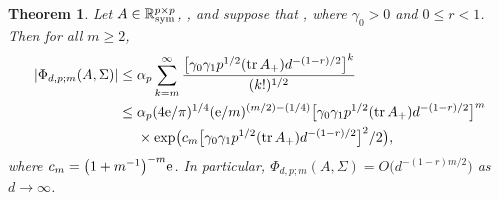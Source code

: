 \documentclass[pdftex]{sigma}
\numberwithin{equation}{section}
\newtheorem{Theorem}{Theorem}[section]
\def\R {\mathbb{R}}
\def\tr {\mathop{\mathrm{tr}}}
\newcommand{\sym}{{{\hskip-1pt}\mathop{\mathrm{sym}}}}
\begin{document}
\begin{Theorem}
\label{thm_Phi_m_bound_Bingham}
Let $A \in \R^{p \times p}_\sym$, \smash{$\Sigma \in \R^{d \times d}_\sym$}, and suppose that , where $\gamma_0 > 0$ and $0 \le r < 1$. Then for all $m \ge 2$,
\begin{align}
|\Phi_{d,p;m}(A,\Sigma)| \le{}& \alpha_p \sum_{k=m}^\infty \frac{\bigl[\gamma_0 \gamma_1 p^{1/2} (\tr A_+) d^{-(1-r)/2}\bigr]^k}{(k!)^{1/2}} \label{eq_Phi_m_bound} \\
\le{}& \alpha_p (4 {\rm e}/\pi)^{1/4} ({\rm e}/m)^{(m/2)-(1/4)}
\bigl[\gamma_0 \gamma_1 p^{1/2} (\tr A_+) d^{-(1-r)/2}\bigr]^m \nonumber \\
& \times \exp\bigl(c_m \bigl[\gamma_0 \gamma_1 p^{1/2} (\tr A_+) d^{-(1-r)/2}\bigr]^2/2\bigr), \label{eq_Phi_m_boundw}
\end{align}
where $c_m = \bigl(1+m^{-1}\bigr)^{-m} {\rm e}$. In particular, $\Phi_{d,p;m}(A,\Sigma) = O\bigl(d^{-(1-r)m/2}\bigr)$ as $d \to \infty$.
\end{Theorem}
\end{document}
